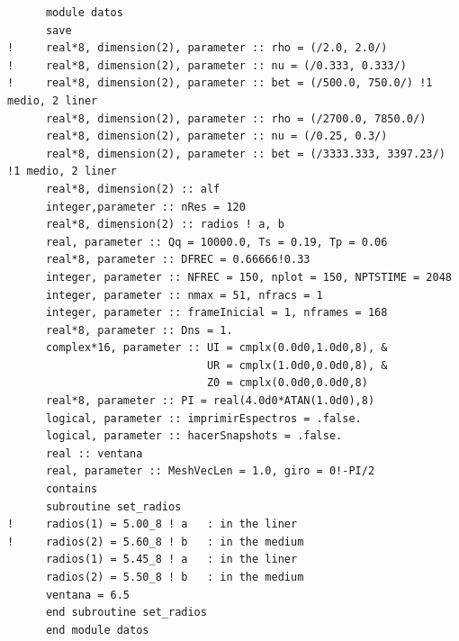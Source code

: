 \documentclass [11pt,spanish]{article}
\begin{document}
\begin{shaded}
\begin{verbatim}
      module datos
      save
!     real*8, dimension(2), parameter :: rho = (/2.0, 2.0/)
!     real*8, dimension(2), parameter :: nu = (/0.333, 0.333/)
!     real*8, dimension(2), parameter :: bet = (/500.0, 750.0/) !1 medio, 2 liner
      real*8, dimension(2), parameter :: rho = (/2700.0, 7850.0/)
      real*8, dimension(2), parameter :: nu = (/0.25, 0.3/)
      real*8, dimension(2), parameter :: bet = (/3333.333, 3397.23/) !1 medio, 2 liner
      real*8, dimension(2) :: alf
      integer,parameter :: nRes = 120
      real*8, dimension(2) :: radios ! a, b 
      real, parameter :: Qq = 10000.0, Ts = 0.19, Tp = 0.06
      real*8, parameter :: DFREC = 0.66666!0.33
      integer, parameter :: NFREC = 150, nplot = 150, NPTSTIME = 2048
      integer, parameter :: nmax = 51, nfracs = 1
      integer, parameter :: frameInicial = 1, nframes = 168
      real*8, parameter :: Dns = 1.
      complex*16, parameter :: UI = cmplx(0.0d0,1.0d0,8), &
                               UR = cmplx(1.0d0,0.0d0,8), &
                               Z0 = cmplx(0.0d0,0.0d0,8)
      real*8, parameter :: PI = real(4.0d0*ATAN(1.0d0),8)
      logical, parameter :: imprimirEspectros = .false.
      logical, parameter :: hacerSnapshots = .false.
      real :: ventana
      real, parameter :: MeshVecLen = 1.0, giro = 0!-PI/2
      contains
      subroutine set_radios
!     radios(1) = 5.00_8 ! a   : in the liner
!     radios(2) = 5.60_8 ! b   : in the medium
      radios(1) = 5.45_8 ! a   : in the liner
      radios(2) = 5.50_8 ! b   : in the medium
      ventana = 6.5
      end subroutine set_radios
      end module datos
\end{verbatim}
\end{shaded}
\endgroup
\end{document}
